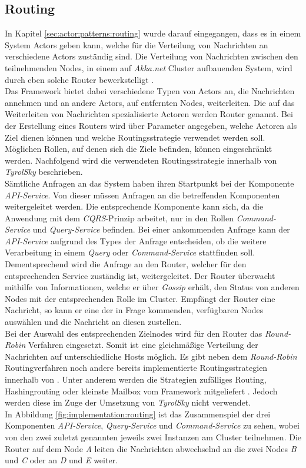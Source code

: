 \subsection{Routing}
\label{subsec:implementation:akkaRouting}
In Kapitel \ref{sec:actor:patterns:routing} wurde darauf eingegangen, dass es in einem System Actors geben kann, welche für die Verteilung von Nachrichten an verschiedene Actors zuständig sind. Die Verteilung von Nachrichten zwischen den teilnehmenden Nodes, in einem auf \textit{Akka.net} Cluster aufbauenden System, wird durch eben solche Router bewerkstelligt \citep{Akka.netCommunityAkka.NETDocumentation}. \\
Das Framework bietet dabei verschiedene Typen von Actors an, die Nachrichten annehmen und an andere Actors, auf entfernten Nodes, weiterleiten. Die auf das Weiterleiten von Nachrichten spezialisierte Actoren werden Router genannt. Bei der Erstellung eines Routers wird über Parameter angegeben, welche Actoren als Ziel dienen können und welche Routingsstrategie verwendet werden soll. Möglichen Rollen, auf denen sich die Ziele befinden, können eingeschränkt werden. Nachfolgend wird die verwendeten Routingsstrategie innerhalb von \textit{TyrolSky} beschrieben. \\
Sämtliche Anfragen an das System haben ihren Startpunkt bei der Komponente \textit{API-Service}. Von dieser müssen Anfragen an die betreffenden Komponenten weitergeleitet werden. Die entsprechende Komponente kann sich, da die Anwendung mit dem \textit{CQRS}-Prinzip arbeitet, nur in den Rollen \textit{Command-Service} und \textit{Query-Service} befinden. Bei einer ankommenden Anfrage kann der \textit{API-Service} aufgrund des Types der Anfrage entscheiden, ob die weitere Verarbeitung in einem \textit{Query} oder \textit{Command-Service} stattfinden soll. Dementsprechend wird die Anfrage an den Router, welcher für den entsprechenden Service zuständig ist, weitergeleitet. Der Router überwacht mithilfe von Informationen, welche er über \textit{Gossip} erhält, den Status von anderen Nodes mit der entsprechenden Rolle im Cluster. Empfängt der Router eine Nachricht, so kann er eine der in Frage kommenden, verfügbaren Nodes auswählen und die Nachricht an diesen zustellen. \\
Bei der Auswahl des entsprechenden Zielnodes wird  für den Router das \textit{Round-Robin} Verfahren eingesetzt. Somit ist eine gleichmäßige Verteilung der Nachrichten auf  unterschiedliche Hosts möglich. Es gibt neben dem \textit{Round-Robin} Routingverfahren noch andere bereits implementierte Routingsstrategien innerhalb von . Unter anderem werden die Strategien zufälliges Routing, Hashingrouting oder kleinste Mailbox vom Framework mitgeliefert \citep{Akka.netCommunityAkka.NETDocumentation}. Jedoch werden diese im Zuge der Umsetzung von \textit{TyrolSky} nicht verwendet. \\
In Abbildung \ref{fig:implementation:routing} ist das Zusammenspiel der drei Komponenten \textit{API-Service}, \textit{Query-Service} und \textit{Command-Service} zu sehen, wobei von den zwei zuletzt genannten jeweils zwei Instanzen am Cluster teilnehmen. Die Router auf dem Node \textit{A} leiten die Nachrichten abwechselnd an die zwei Nodes \textit{B} und \textit{C} oder an \textit{D} und \textit{E} weiter. 

